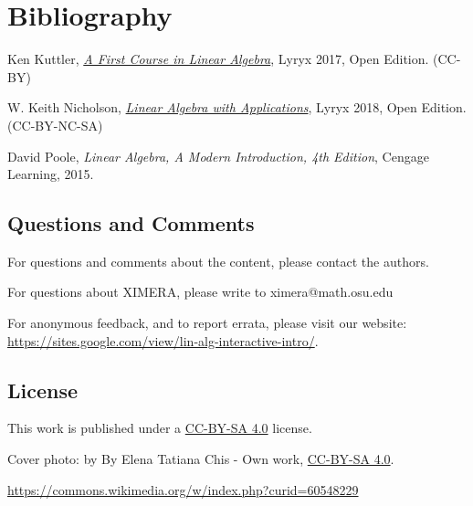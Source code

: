 \documentclass{ximera}
\begin{document}
\section*{Bibliography}

Ken Kuttler, \href{https://open.umn.edu/opentextbooks/textbooks/a-first-course-in-linear-algebra-2017}{\it A First Course in Linear Algebra}, Lyryx 2017, Open Edition. (CC-BY)

W. Keith Nicholson, \href{https://open.umn.edu/opentextbooks/textbooks/linear-algebra-with-applications}{\it Linear Algebra with Applications}, Lyryx 2018, Open Edition. (CC-BY-NC-SA)

David Poole, {\it Linear Algebra, A Modern Introduction, 4th Edition}, Cengage Learning, 2015.  


\subsection{Questions and Comments}
For questions and comments about the content, please contact the authors.

For questions about XIMERA, please write to ximera@math.osu.edu

For anonymous feedback, and to report errata, please visit our website: \href{https://sites.google.com/view/lin-alg-interactive-intro/}{https://sites.google.com/view/lin-alg-interactive-intro/}.

\subsection{License}
This work is published under a \href{https://creativecommons.org/licenses/by-sa/4.0/deed.en}{CC-BY-SA 4.0} license.

Cover photo:   by By Elena Tatiana Chis - Own work, \href{https://creativecommons.org/licenses/by-sa/4.0/deed.en}{CC-BY-SA 4.0}.  

\href{https://commons.wikimedia.org/w/index.php?curid=60548229}{https://commons.wikimedia.org/w/index.php?curid=60548229}
\end{document}
